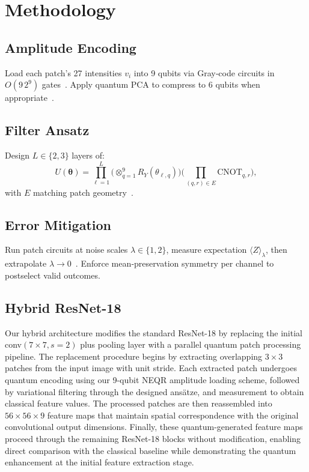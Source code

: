 \documentclass[onecolumn,12pt]{IEEEtran}
\begin{document}
\section{Methodology}
\subsection{Amplitude Encoding}
Load each patch’s 27 intensities $v_i$ into 9 qubits via Gray‐code circuits in $O(9\,2^9)$ gates~\cite{plessch2011quantum}. Apply quantum PCA to compress to 6 qubits when appropriate~\cite{yu2019quantum}.

\subsection{Filter Ansatz}
Design $L\in\{2,3\}$ layers of:
\[
U(\boldsymbol\theta)=\prod_{\ell=1}^{L}
\bigl(\otimes_{q=1}^9R_Y(\theta_{\ell,q})\bigr)
\bigl(\prod_{(q,r)\in E}\mathrm{CNOT}_{q,r}\bigr),
\]
with $E$ matching patch geometry~\cite{sugisaki2019quantum}.

\subsection{Error Mitigation}
Run patch circuits at noise scales $\lambda\in\{1,2\}$, measure expectation $\langle Z\rangle_\lambda$, then extrapolate $\lambda\to0$~\cite{zhu2022efficient}. Enforce mean‐preservation symmetry per channel to postselect valid outcomes.

\subsection{Hybrid ResNet-18}
Our hybrid architecture modifies the standard ResNet-18 by replacing the initial conv$(7 \times 7, s=2)$ plus pooling layer with a parallel quantum patch processing pipeline. The replacement procedure begins by extracting overlapping $3 \times 3$ patches from the input image with unit stride. Each extracted patch undergoes quantum encoding using our 9-qubit NEQR amplitude loading scheme, followed by variational filtering through the designed ansätze, and measurement to obtain classical feature values. The processed patches are then reassembled into $56 \times 56 \times 9$ feature maps that maintain spatial correspondence with the original convolutional output dimensions. Finally, these quantum-generated feature maps proceed through the remaining ResNet-18 blocks without modification, enabling direct comparison with the classical baseline while demonstrating the quantum enhancement at the initial feature extraction stage.
\end{document}
